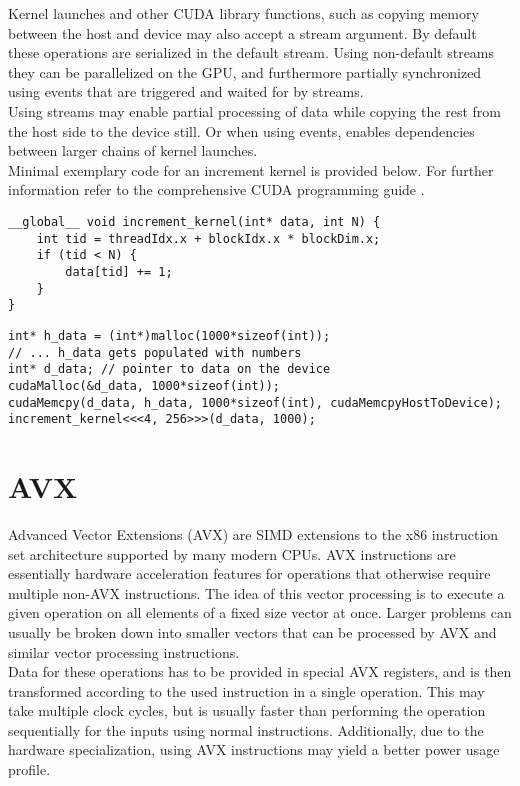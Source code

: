 \documentclass{tudscrreprt}
\begin{document}
				Kernel launches and other CUDA library functions, such as copying memory between the host and device may also accept a stream argument. By default these operations are serialized in the default stream. Using non-default streams they can be parallelized on the GPU, and furthermore partially synchronized using events that are triggered and waited for by streams. \\
				Using streams may enable partial processing of data while copying the rest from the host side to the device still. Or when using events, enables dependencies between larger chains of kernel launches. \\
				
				Minimal exemplary code for an increment kernel is provided below. For further information refer to the comprehensive CUDA programming guide \cite{cuda_programmingguide}.
				\begin{lstlisting}[caption=Device Side: Increment Kernel]
__global__ void increment_kernel(int* data, int N) {
	int tid = threadIdx.x + blockIdx.x * blockDim.x;
	if (tid < N) {
		data[tid] += 1;
	}
}
				\end{lstlisting}
				
				\begin{lstlisting}[caption=Host Side: Device Malloc and Kernel Launch]
int* h_data = (int*)malloc(1000*sizeof(int));
// ... h_data gets populated with numbers
int* d_data; // pointer to data on the device
cudaMalloc(&d_data, 1000*sizeof(int));
cudaMemcpy(d_data, h_data, 1000*sizeof(int), cudaMemcpyHostToDevice);
increment_kernel<<<4, 256>>>(d_data, 1000);
				\end{lstlisting}
				
			
		\section{AVX}
			Advanced Vector Extensions (AVX) \cite{avx} are SIMD extensions to the x86 instruction set architecture supported by many modern CPUs. AVX instructions are essentially hardware acceleration features for operations that otherwise require multiple non-AVX instructions. The idea of this vector processing is to execute a given operation on all elements of a fixed size vector at once. Larger problems can usually be broken down into smaller vectors that can be processed by AVX and similar vector processing instructions. \\
			Data for these operations has to be provided in special AVX registers, and is then transformed according to the used instruction in a single operation. This may take multiple clock cycles, but is usually faster than performing the operation sequentially for the inputs using normal instructions. Additionally, due to the hardware specialization, using AVX instructions may yield a better power usage profile. \\
			
\end{document}
